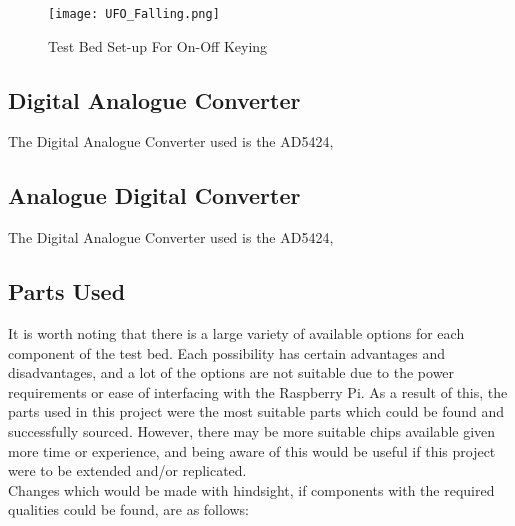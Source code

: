 \documentclass[../main.tex]{subfiles}
\begin{document}

\begin{figure}[ht]
	\centering
	\texttt{[image: UFO\_Falling.png]}
	\caption{Test Bed Set-up For On-Off Keying}
	\label{fig_OOK Architecture}
\end{figure}

\subsection{Digital Analogue Converter}

The Digital Analogue Converter used is the AD5424, 

\subsection{Analogue Digital Converter}

The Digital Analogue Converter used is the AD5424, 

\subsection{Parts Used}

It is worth noting that there is a large variety of available options for each component of the test bed.
Each possibility has certain advantages and disadvantages, and a lot of the options are not suitable due to the power requirements or ease of interfacing with the Raspberry Pi.
As a result of this, the parts used in this project were the most suitable parts which could be found and successfully sourced.
However, there may be more suitable chips available given more time or experience, and being aware of this would be useful if this project were to be extended and/or replicated.\\

Changes which would be made with hindsight, if components with the required qualities could be found, are as follows:
\end{document}
